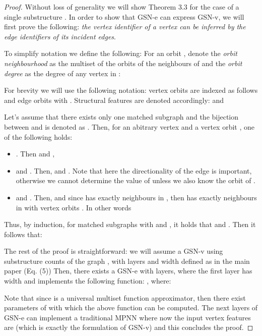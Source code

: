 \begin{proof}
Without loss of generality we will show Theorem 3.3 for the case of a single substructure . In order to show that GSN-e can express GSN-v, we will first prove the following: \textit{the vertex identifier of a vertex  can be inferred by the edge identifiers of its incident edges}.

To simplify notation we define the following: For an orbit , denote the \textit{orbit neighbourhood} as the multiset of the orbits of the neighbours of  and the \textit{orbit degree} as the degree of any vertex in   :


For brevity we will use the following notation: vertex orbits are indexed as follows  and edge orbits  with . Structural features are denoted accordingly:  and 






Let's assume that there exists only one matched subgraph  and the bijection between  and  is denoted as . Then, for an abitrary vertex  and a vertex orbit , one of the following holds:
\begin{itemize}
    \item . Then  and ,
    \item  and . Then,  and . Note that here the directionality of the edge is important, otherwise we cannot determine the value of  unless we also know the orbit of .
    \item  and . Then,  and since  has exactly  neighbours in , then  has exactly  neighbours in  with vertex orbits . In other words
    
\end{itemize}

Thus, by induction, for  matched subgraphs  with  and , it holds that  and . Then it follows that:




The rest of the proof is straightforward: we will assume a GSN-v using substructure counts of the graph , with  layers and width  defined as in the main paper (Eq. (5))
Then, there exists a GSN-e with  layers, where the first layer has width  and implements the following function: , where:

Note that since  is a universal multiset function approximator, then there exist parameters of  with which the above function can be computed. The next  layers of GSN-e can implement a traditional MPNN where now the input vertex features are  (which is exactly the formulation of GSN-v) and this concludes the proof. 

\end{proof}




